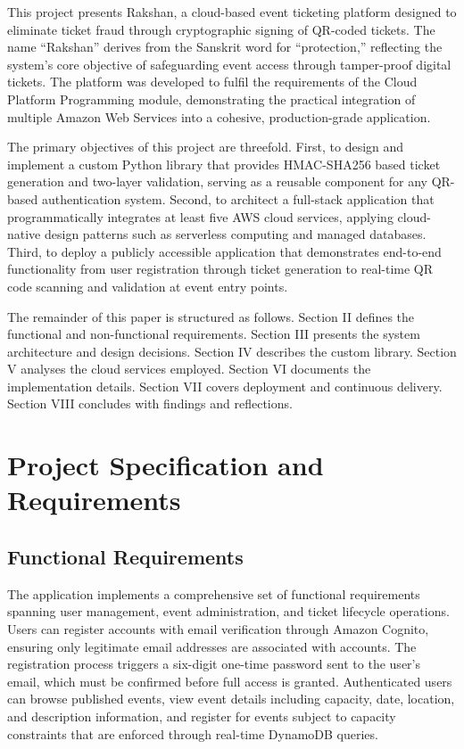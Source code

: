 \documentclass[conference]{IEEEtran}
\begin{document}
This project presents Rakshan, a cloud-based event ticketing platform designed to eliminate ticket fraud through cryptographic signing of QR-coded tickets. The name ``Rakshan'' derives from the Sanskrit word for ``protection,'' reflecting the system's core objective of safeguarding event access through tamper-proof digital tickets. The platform was developed to fulfil the requirements of the Cloud Platform Programming module, demonstrating the practical integration of multiple Amazon Web Services into a cohesive, production-grade application.

The primary objectives of this project are threefold. First, to design and implement a custom Python library that provides HMAC-SHA256 based ticket generation and two-layer validation, serving as a reusable component for any QR-based authentication system. Second, to architect a full-stack application that programmatically integrates at least five AWS cloud services, applying cloud-native design patterns such as serverless computing and managed databases. Third, to deploy a publicly accessible application that demonstrates end-to-end functionality from user registration through ticket generation to real-time QR code scanning and validation at event entry points.

The remainder of this paper is structured as follows. Section II defines the functional and non-functional requirements. Section III presents the system architecture and design decisions. Section IV describes the custom library. Section V analyses the cloud services employed. Section VI documents the implementation details. Section VII covers deployment and continuous delivery. Section VIII concludes with findings and reflections.

\section{Project Specification and Requirements}

\subsection{Functional Requirements}

The application implements a comprehensive set of functional requirements spanning user management, event administration, and ticket lifecycle operations. Users can register accounts with email verification through Amazon Cognito, ensuring only legitimate email addresses are associated with accounts. The registration process triggers a six-digit one-time password sent to the user's email, which must be confirmed before full access is granted. Authenticated users can browse published events, view event details including capacity, date, location, and description information, and register for events subject to capacity constraints that are enforced through real-time DynamoDB queries.
\end{document}
